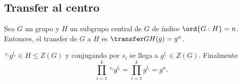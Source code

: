 
\subsection{Transfer al centro}

\begin{proposicion}
	Sea $G$ un grupo y $H$ un subgrupo central de $G$ de índice $\ord{G:H}=n$. Entonces, el transfer de $G$ a $H$ es $\transfer G H (g) = g^{n}$.
	\begin{demostracion}
		$\,^{s_i}g^{l_i}\in H\leq Z(G)$ y conjugando por $s_i$ se llega a $g^{l_i}\in Z(G)$. Finalmente 
		\begin{equation}
			\prod_{i=1}^k \,^{s_i}g^{l_i} = \prod_{i=1}^k g^{l_i} = g^n.
		\end{equation}
	\end{demostracion}
\end{proposicion}


